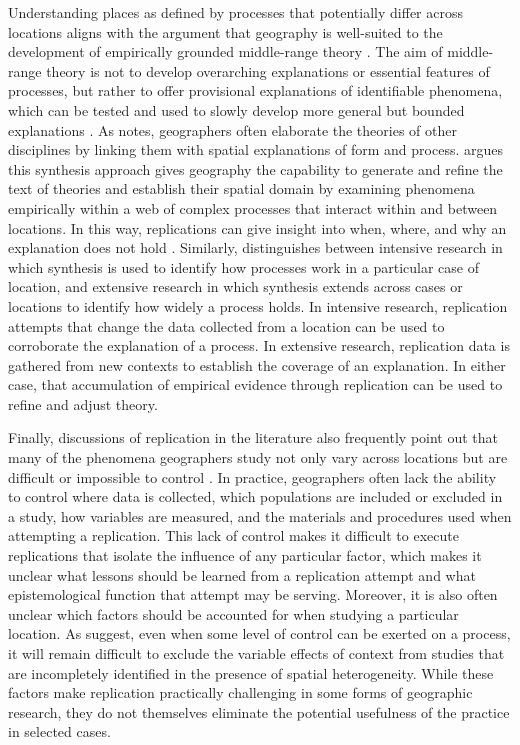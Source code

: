 \documentclass[]{interact}
\theoremstyle{plain}%
\theoremstyle{definition}
\theoremstyle{remark}
\begin{document}
Understanding places as defined by processes that potentially differ across locations aligns with the argument that geography is well-suited to the development of empirically grounded middle-range theory \citep{miller2015data}.
The aim of middle-range theory is not to develop overarching explanations or essential features of processes, but rather to offer provisional explanations of identifiable phenomena, which can be tested and used to slowly develop more general but bounded explanations \citep{merton1968social}.
As \cite{harvey1969} notes, geographers often elaborate the theories of other disciplines by linking them with spatial explanations of form and process.
\cite{turner1989, turner2002} argues this synthesis approach gives geography the capability to generate and refine the text of theories and establish their spatial domain by examining phenomena empirically within a web of complex processes that interact within and between locations. 
In this way, replications can give insight into when, where, and why an explanation does not hold \citep{zhang_wolf_2023}.
Similarly, \cite{sayer1992method} distinguishes between intensive research in which synthesis is used to identify how processes work in a particular case of location, and extensive research in which synthesis extends across cases or locations to identify how widely a process holds. 
In intensive research, replication attempts that change the data collected from a location can be used to corroborate the explanation of a process.
In extensive research, replication data is gathered from new contexts to establish the coverage of an explanation. 
In either case, that accumulation of empirical evidence through replication can be used to refine and adjust theory.

Finally, discussions of replication in the literature also frequently point out that many of the phenomena geographers study not only vary across locations but are difficult or impossible to control \citep[see][]{sayer1992method, kedron2021GA, waters2021motivations}. 
In practice, geographers often lack the ability to control where data is collected, which populations are included or excluded in a study, how variables are measured, and the materials and procedures used when attempting a replication.
This lack of control makes it difficult to execute replications that isolate the influence of any particular factor, which makes it unclear what lessons should be learned from a replication attempt and what epistemological function that attempt may be serving. 
Moreover, it is also often unclear which factors should be accounted for when studying a particular location.
As \cite{goodchild2021replication} suggest, even when some level of control can be exerted on a process, it will remain difficult to exclude the variable effects of context from studies that are incompletely identified in the presence of spatial heterogeneity.
While these factors make replication practically challenging in some forms of geographic research, they do not themselves eliminate the potential usefulness of the practice in selected cases. 
\end{document}
